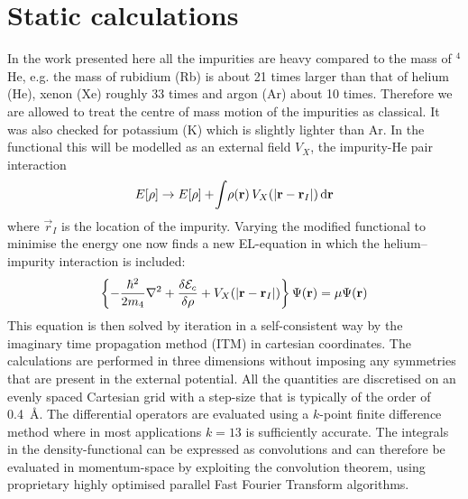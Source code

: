 	\section{Static calculations}
		In the work presented here all the impurities are heavy compared to the mass of $^4$He, e.g. the mass of rubidium (Rb) is about 21 times larger than that of helium (He), xenon (Xe) roughly 33 times and argon (Ar) about 10 times. Therefore we are allowed to treat the centre of mass motion of the impurities as classical. It was also checked for potassium (K) which is slightly lighter than Ar\citep{Martinez2017}. In the functional this will be modelled as an external field $V_X$, the impurity-He pair interaction
		\begin{align}
			E[\rho] \rightarrow E[\rho] + \!\int\!\rho(\bm{\mathrm{r}})\,V_X\qty(\abs{\bm{\mathrm{r}}-\bm{\mathrm{r}}_I})\,\mathrm{d}{\bm{\mathrm{r}}} \label{eq:el-static-hi}
		\end{align}
		where ${\vec r}_I$ is the location of the impurity. Varying the modified functional to minimise the energy one now finds a new EL-equation in which the helium--impurity interaction is included:
		\begin{align}
			\left\{-\frac{\hbar^2}{2m_4} \laplacian + \fdv{\mathcal{E}_c}{\rho} + V_X(|{\mathbf r} - {\mathbf r_I}|)\right\}\Psi({\mathbf r}) = \mu \Psi({\mathbf r})
		\end{align}
		This equation is then solved by iteration in a self-consistent way by the imaginary time propagation method\citep{Lehtovaara2007} (ITM) in cartesian coordinates. The calculations are performed in three dimensions without imposing any symmetries that are present in the external potential. All the quantities are discretised on an evenly spaced Cartesian grid with a step-size that is typically of the order of 0.4~\AA. The differential operators are evaluated using a $k$-point finite difference method where in most applications $k=13$ is sufficiently accurate. The integrals in the density-functional can be expressed as convolutions and can therefore be evaluated in momentum-space by exploiting the convolution theorem, using proprietary highly optimised parallel Fast Fourier Transform algorithms. 
			

